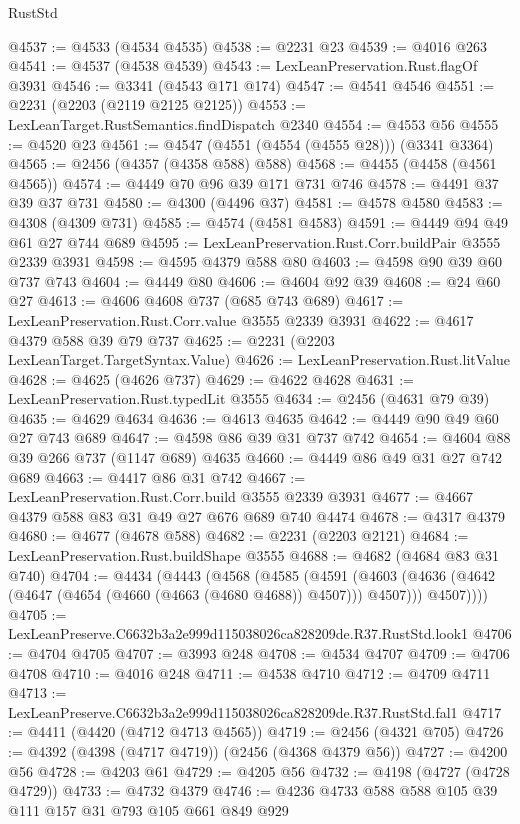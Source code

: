\begin{lexlean}{RustStd}
\begin{coremodule}
@4537 := @4533 (@4534 @4535)
@4538 := @2231 @23
@4539 := @4016 @263
@4541 := @4537 (@4538 @4539)
@4543 := LexLeanPreservation.Rust.flagOf @3931
@4546 := @3341 (@4543 @171 @174)
@4547 := @4541 @4546
@4551 := @2231 (@2203 (@2119 @2125 @2125))
@4553 := LexLeanTarget.RustSemantics.findDispatch @2340
@4554 := @4553 @56
@4555 := @4520 @23
@4561 := @4547 (@4551 (@4554 (@4555 @28))) (@3341 @3364)
@4565 := @2456 (@4357 (@4358 @588) @588)
@4568 := @4455 (@4458 (@4561 @4565))
@4574 := @4449 @70 @96 @39 @171 @731 @746
@4578 := @4491 @37 @39 @37 @731
@4580 := @4300 (@4496 @37)
@4581 := @4578 @4580
@4583 := @4308 (@4309 @731)
@4585 := @4574 (@4581 @4583)
@4591 := @4449 @94 @49 @61 @27 @744 @689
@4595 := LexLeanPreservation.Rust.Corr.buildPair @3555 @2339 @3931
@4598 := @4595 @4379 @588 @80
@4603 := @4598 @90 @39 @60 @737 @743
@4604 := @4449 @80
@4606 := @4604 @92 @39
@4608 := @24 @60 @27
@4613 := @4606 @4608 @737 (@685 @743 @689)
@4617 := LexLeanPreservation.Rust.Corr.value @3555 @2339 @3931
@4622 := @4617 @4379 @588 @39 @79 @737
@4625 := @2231 (@2203 LexLeanTarget.TargetSyntax.Value)
@4626 := LexLeanPreservation.Rust.litValue
@4628 := @4625 (@4626 @737)
@4629 := @4622 @4628
@4631 := LexLeanPreservation.Rust.typedLit @3555
@4634 := @2456 (@4631 @79 @39)
@4635 := @4629 @4634
@4636 := @4613 @4635
@4642 := @4449 @90 @49 @60 @27 @743 @689
@4647 := @4598 @86 @39 @31 @737 @742
@4654 := @4604 @88 @39 @266 @737 (@1147 @689) @4635
@4660 := @4449 @86 @49 @31 @27 @742 @689
@4663 := @4417 @86 @31 @742
@4667 := LexLeanPreservation.Rust.Corr.build @3555 @2339 @3931
@4677 := @4667 @4379 @588 @83 @31 @49 @27 @676 @689 @740 @4474
@4678 := @4317 @4379
@4680 := @4677 (@4678 @588)
@4682 := @2231 (@2203 @2121)
@4684 := LexLeanPreservation.Rust.buildShape @3555
@4688 := @4682 (@4684 @83 @31 @740)
@4704 := @4434
    (@4443
      (@4568
        (@4585
          (@4591
            (@4603 (@4636 (@4642 (@4647 (@4654 (@4660 (@4663 (@4680 @4688)) @4507))) @4507)))
            @4507))))
@4705 := LexLeanPreserve.C6632b3a2e999d115038026ca828209de.R37.RustStd.look1
@4706 := @4704 @4705
@4707 := @3993 @248
@4708 := @4534 @4707
@4709 := @4706 @4708
@4710 := @4016 @248
@4711 := @4538 @4710
@4712 := @4709 @4711
@4713 := LexLeanPreserve.C6632b3a2e999d115038026ca828209de.R37.RustStd.fal1
@4717 := @4411 (@4420 (@4712 @4713 @4565))
@4719 := @2456 (@4321 @705)
@4726 := @4392 (@4398 (@4717 @4719)) (@2456 (@4368 @4379 @56))
@4727 := @4200 @56
@4728 := @4203 @61
@4729 := @4205 @56
@4732 := @4198 (@4727 (@4728 @4729))
@4733 := @4732 @4379
@4746 := @4236 @4733 @588 @588 @105 @39 @111 @157 @31 @793 @105 @661 @849 @929

\end{coremodule}
\end{lexlean}
